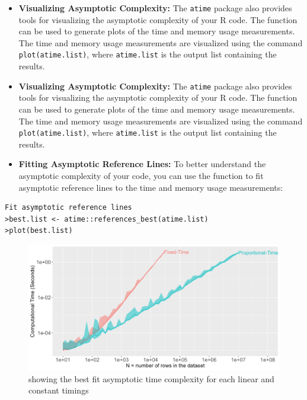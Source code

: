\begin{itemize}


    \item \textbf{Visualizing Asymptotic Complexity:} The \texttt{atime} package also provides tools for visualizing the asymptotic complexity of your R code. The  function can be used to generate plots of the time and memory usage measurements. The time and memory usage measurements are visualized using the command \texttt{plot(atime.list)}, where \texttt{atime.list} is the output list containing the results.

\item \textbf{Visualizing Asymptotic Complexity:} The \texttt{atime} package also provides tools for visualizing the asymptotic complexity of your R code. The  function can be used to generate plots of the time and memory usage measurements. The time and memory usage measurements are visualized using the command \texttt{plot(atime.list)}, where \texttt{atime.list} is the output list containing the results.


\vspace{0.1in}
\item \textbf{Fitting Asymptotic Reference Lines:} To better understand the asymptotic complexity of your code, you can use the  function to fit asymptotic reference lines to the time and memory usage measurements:

\end{itemize}

\begin{lstlisting}
Fit asymptotic reference lines
>best.list <- atime::references_best(atime.list)
>plot(best.list)
\end{lstlisting}
\vspace{0.1in}

\begin{figure}[H]
    \centering
    \includegraphics[width=0.8\linewidth]{figures/best.list.R.png}
    \caption{showing the best fit asymptotic time complexity for each linear and constant timings}
    \label{fig:label1}
\end{figure}

